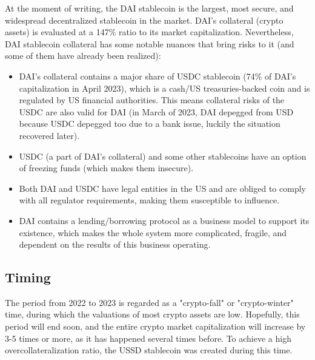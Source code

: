 At the moment of writing, the DAI stablecoin is the largest, most secure, and widespread 
decentralized stablecoin in the market. DAI's collateral (crypto assets) is evaluated at a 
147\% ratio to its market capitalization. Nevertheless, DAI stablecoin collateral has some 
notable nuances that bring risks to it (and some of them have already been realized):
\begin{itemize}
  \item DAI's collateral contains a major share of USDC stablecoin (74\% of DAI's capitalization 
  in April 2023), which is a cash/US treasuries-backed coin and is regulated by US financial authorities. 
  This means collateral risks of the USDC are also valid for DAI (in March of 2023, DAI depegged 
  from USD because USDC depegged too due to a bank issue, luckily the situation recovered later).
  \item USDC (a part of DAI's collateral) and some other stablecoins have an option of freezing 
  funds (which makes them insecure).
  \item Both DAI and USDC have legal entities in the US and are obliged to comply with all 
  regulator requirements, making them susceptible to influence.
  \item DAI contains a lending/borrowing protocol as a business model to support its existence, 
  which makes the whole system more complicated, fragile, and dependent on the results of this 
  business operating.
\end{itemize}

\subsection{Timing}

The period from 2022 to 2023 is regarded as a "crypto-fall" or "crypto-winter" time, during 
which the valuations of most crypto assets are low. Hopefully, this period will end soon, 
and the entire crypto market capitalization will increase by 3-5 times or more, as it has 
happened several times before. To achieve a high overcollateralization ratio, the USSD 
stablecoin was created during this time.

